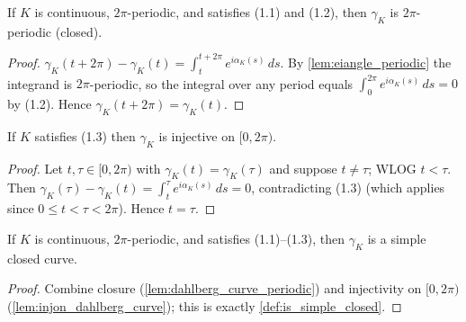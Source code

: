 \begin{lemma}


  \label{lem:dahlberg_curve_periodic}
  If $K$ is continuous, $2\pi$-periodic, and satisfies (1.1) and (1.2), then
  $\gamma_K$ is $2\pi$-periodic (closed).
\end{lemma}
\begin{proof}
  \leanok
  $\gamma_K(t+2\pi)-\gamma_K(t)=\int_t^{t+2\pi}e^{i\alpha_K(s)}\,ds$. By
  \cref{lem:eiangle_periodic} the integrand is $2\pi$-periodic, so the integral
  over any period equals $\int_0^{2\pi}e^{i\alpha_K(s)}\,ds=0$ by (1.2). Hence
  $\gamma_K(t+2\pi)=\gamma_K(t)$.
\end{proof}

\begin{lemma}


\leanok
[Simplicity: $\gamma_K$ is injective on $[0,2\pi)$]
  \label{lem:injon_dahlberg_curve}
  If $K$ satisfies (1.3) then $\gamma_K$ is injective on $[0,2\pi)$.
\end{lemma}
\begin{proof}
  \leanok
  Let $t,\tau\in[0,2\pi)$ with $\gamma_K(t)=\gamma_K(\tau)$ and suppose $t\neq\tau$;
  WLOG $t<\tau$. Then $\gamma_K(\tau)-\gamma_K(t)=\int_t^\tau e^{i\alpha_K(s)}\,ds
  =0$, contradicting (1.3) (which applies since $0\le t<\tau<2\pi$). Hence
  $t=\tau$.
\end{proof}

\begin{lemma}


  \label{lem:issimpleclosed_dahlberg_curve}
  If $K$ is continuous, $2\pi$-periodic, and satisfies (1.1)--(1.3), then
  $\gamma_K$ is a simple closed curve.
\end{lemma}
\begin{proof}
  \leanok
  Combine closure (\cref{lem:dahlberg_curve_periodic}) and injectivity on
  $[0,2\pi)$ (\cref{lem:injon_dahlberg_curve}); this is exactly
  \cref{def:is_simple_closed}.
\end{proof}


